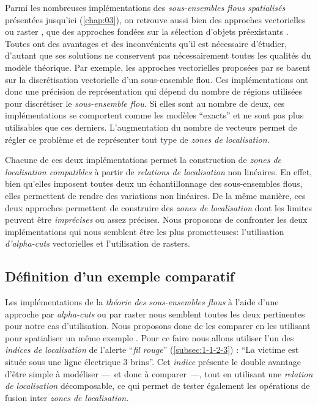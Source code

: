 Parmi les nombreuses implémentations des \emph{sous-ensembles flous
  spatialisés} présentées jusqu'ici (\autoref{chap:03}), on retrouve
aussi bien des approches vectorielles
\autocite{Kanjilal2010,Dilo2007,Zoghlami2016} ou raster
\autocite{Bloch1996}, que des approches fondées sur la sélection
d'objets préexistants \autocite{Duraciova2017}. Toutes ont des
avantages et des inconvénients qu'il est nécessaire d'étudier,
d'autant que ses solutions ne conservent pas nécessairement toutes les
qualités du modèle théorique. Par exemple, les approches vectorielles
proposées par \textcite{Kanjilal2010,Zoghlami2016} se basent sur la
discrétisation vectorielle d'un sous-ensemble flou. Ces
implémentations ont donc une précision de représentation qui dépend du
nombre de régions utilisées pour discrétiser le \emph{sous-ensemble
  flou.} Si elles sont au nombre de deux, ces implémentations se
comportent comme les modèles \enquote{exacts} et ne sont pas plus
utilisables que ces derniers. L'augmentation du nombre de vecteurs
permet de régler ce problème et de représenter tout type de
\emph{zones de localisation.}


Chacune de ces deux implémentations permet la construction de
\emph{zones de localisation compatibles} à partir de \emph{relations
  de localisation} non linéaires. En effet, bien qu'elles imposent
toutes deux un échantillonnage des sous-ensembles flous, elles
permettent de rendre des variations non linéaires. De la même manière,
ces deux approches permettent de construire des \emph{zones de
  localisation} dont les limites peuvent être \emph{imprécises} ou
assez précises. Nous proposons de confronter les deux implémentations
qui nous semblent être les plus prometteuses: l'utilisation
\emph{d'alpha-cuts} vectorielles et l'utilisation de rasters.

\subsection{Définition d'un exemple comparatif}

Les implémentations de la \emph{théorie des sous-ensembles flous} à
l'aide d'une approche par \emph{alpha-cuts} ou par raster nous
semblent toutes les deux pertinentes pour notre cas
d'utilisation. Nous proposons donc de les comparer en les utilisant
pour spatialiser un même exemple \autocite{Bunel2019a}. Pour ce faire
nous allons utiliser l'un des \emph{indices de localisation} de
l'alerte \enquote{\emph{fil rouge}} (\autoref{subsec:1-1-2-3}) :
\enquote{La victime est située sous une ligne électrique 3 brins}. Cet
\emph{indice} présente le double avantage d'être simple à modéliser
---~et donc à comparer~---, tout en utilisant une \emph{relation de
  localisation} décomposable, ce qui permet de tester également les
opérations de fusion inter \emph{zones de localisation.}

